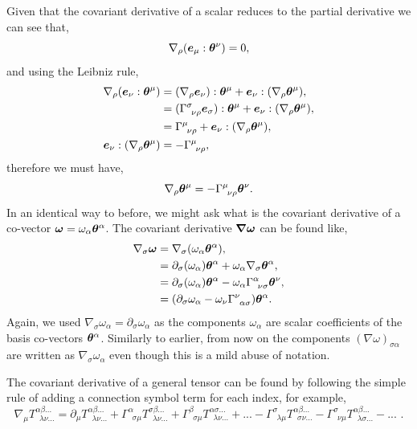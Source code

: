 Given that the covariant derivative of a scalar reduces to the partial derivative we can see that, 
\begin{equation}
\nabla_\rho (\boldsymbol{e}_\mu : \boldsymbol{\theta}^\nu) = 0,
\end{equation}
and using the Leibniz rule, 
\begin{align}
\nabla_\rho (\boldsymbol{e}_\nu : \boldsymbol{\theta}^\mu) &= (\nabla_\rho \boldsymbol{e}_\nu):\boldsymbol{\theta}^\mu + \boldsymbol{e}_\nu:(\nabla_\rho \boldsymbol{\theta}^\mu),\\
 &= (\Gamma^\sigma_{\,\,\,\nu\rho}\boldsymbol{e}_\sigma):\boldsymbol{\theta}^\mu + \boldsymbol{e}_\nu:(\nabla_\rho \boldsymbol{\theta}^\mu),\\
  &= \Gamma^\mu_{\,\,\,\nu\rho} + \boldsymbol{e}_\nu:(\nabla_\rho \boldsymbol{\theta}^\mu),\\
  \boldsymbol{e}_\nu:(\nabla_\rho \boldsymbol{\theta}^\mu) &= -\Gamma^\mu_{\,\,\,\nu\rho},
\end{align}
therefore we must have,
\begin{equation}
\nabla_\rho \boldsymbol{\theta}^\mu = -\Gamma^\mu_{\,\,\,\nu\rho} \boldsymbol{\theta}^\nu.
\end{equation}
In an identical way to before, we might ask what is the covariant derivative of a co-vector $\boldsymbol{\omega}=\omega_\alpha \boldsymbol{\theta}^\alpha$. The covariant derivative $\boldsymbol{\nabla \omega}$ can be found like,
\begin{align}
\nabla_\sigma \boldsymbol {\omega} &= \nabla_\sigma(\omega_\alpha \boldsymbol{\theta}^\alpha),\\
&= \partial_\sigma(\omega_\alpha) \boldsymbol{\theta}^\alpha + \omega_\alpha  \nabla_\sigma \boldsymbol{\theta}^\alpha,\\
&= \partial_\sigma(\omega_\alpha) \boldsymbol{\theta}^\alpha - \omega_\alpha \Gamma^\alpha_{\,\,\,\nu\sigma} \boldsymbol\theta^\nu ,\\
&= (\partial_\sigma\omega_\alpha  - \omega_\nu \Gamma^\nu_{\,\,\,\alpha\sigma} )\boldsymbol\theta^\alpha .
\end{align}
Again, we used $\nabla_\sigma \omega_\alpha = \partial_\sigma \omega_\alpha$ as the components $\omega_\alpha$ are scalar coefficients of the basis co-vectors $\boldsymbol{\theta}^\alpha$. Similarly to earlier, from now on the components $(\nabla \omega)_{\sigma\alpha} $ are written as $ \nabla_\sigma \omega_\alpha$ even though this is a mild abuse of notation.

The covariant derivative of a general tensor can be found by following the simple rule of adding a connection symbol term for each index, for example,
\begin{equation}
\nabla_\mu T^{\alpha\beta ...}_{\,\,\,\lambda\nu ...} = \partial_\mu T^{\alpha\beta ...}_{\,\,\,\lambda\nu ...} 
+ \Gamma^{\alpha}_{\,\,\,\sigma \mu} T^{\sigma\beta ...}_{\,\,\,\lambda\nu ...} + \Gamma^{\beta}_{\,\,\,\sigma\mu} T^{\alpha\sigma ...}_{\,\,\,\lambda\nu ...} + ...
- \Gamma^{\sigma}_{\,\,\,\lambda\mu} T^{\alpha\beta ...}_{\,\,\,\sigma\nu ...} - \Gamma^{\sigma}_{\,\,\,\nu\mu} T^{\alpha\beta ...}_{\,\,\,\lambda\sigma ...} - ...
\,\,.\end{equation}



